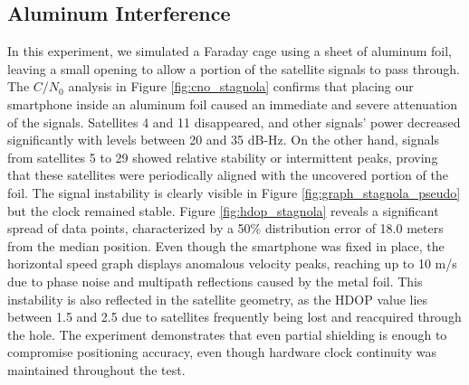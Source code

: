 \subsection{Aluminum Interference}
    In this experiment, we simulated a Faraday cage using a sheet of aluminum foil, leaving a small opening to allow a portion of the satellite signals to pass through. The $C/N_0$ analysis in Figure \ref{fig:cno_stagnola} confirms that placing our smartphone inside an aluminum foil caused an immediate and severe attenuation of the signals.
    Satellites 4 and 11 disappeared, and other signals' power decreased significantly with levels between 20 and 35 dB-Hz. On the other hand, signals from satellites 5 to 29 showed relative stability or intermittent peaks, proving that these satellites were periodically aligned with the uncovered portion of the foil. The signal instability is clearly visible in Figure \ref{fig:graph_stagnola_pseudo} but the clock remained stable. 
    \noindent Figure \ref{fig:hdop_stagnola} reveals a significant spread of data points, characterized by a 50\% distribution error of 18.0 meters from the median position. Even though the smartphone was fixed in place, the horizontal speed graph displays anomalous velocity peaks, reaching up to 10 m/s due to phase noise and multipath reflections caused by the metal foil. This instability is also reflected in the satellite geometry, as the HDOP value lies between 1.5 and 2.5 due to satellites frequently being lost and reacquired through the hole. The experiment demonstrates that even partial shielding is enough to compromise positioning accuracy, even though hardware clock continuity was maintained throughout the test.
    
